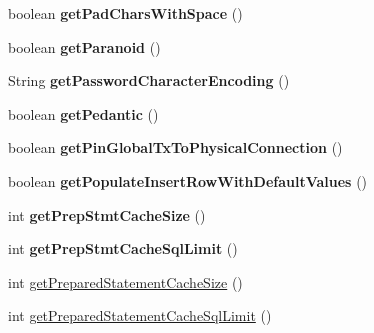 \begin{DoxyCompactItemize}
boolean {\bfseries get\+Pad\+Chars\+With\+Space} ()
\item 
\mbox{\label{classcom_1_1mysql_1_1jdbc_1_1_multi_host_my_s_q_l_connection_aef3281dd78972fb804fabcd9b445b0b8}} 
boolean {\bfseries get\+Paranoid} ()
\item 
\mbox{\label{classcom_1_1mysql_1_1jdbc_1_1_multi_host_my_s_q_l_connection_a4285fc8c28cfef8a1a963eb583625db9}} 
String {\bfseries get\+Password\+Character\+Encoding} ()
\item 
\mbox{\label{classcom_1_1mysql_1_1jdbc_1_1_multi_host_my_s_q_l_connection_a784448d55787eb5936aa78ae6fc3907e}} 
boolean {\bfseries get\+Pedantic} ()
\item 
\mbox{\label{classcom_1_1mysql_1_1jdbc_1_1_multi_host_my_s_q_l_connection_a90759bd97891acb552b5386220049e08}} 
boolean {\bfseries get\+Pin\+Global\+Tx\+To\+Physical\+Connection} ()
\item 
\mbox{\label{classcom_1_1mysql_1_1jdbc_1_1_multi_host_my_s_q_l_connection_ac2002381caf2e79b0a81c02d7b4b04c3}} 
boolean {\bfseries get\+Populate\+Insert\+Row\+With\+Default\+Values} ()
\item 
\mbox{\label{classcom_1_1mysql_1_1jdbc_1_1_multi_host_my_s_q_l_connection_a14716683053715063033c2d81e833cbf}} 
int {\bfseries get\+Prep\+Stmt\+Cache\+Size} ()
\item 
\mbox{\label{classcom_1_1mysql_1_1jdbc_1_1_multi_host_my_s_q_l_connection_ada21d005d5c435a1746c3d6c4bc10eca}} 
int {\bfseries get\+Prep\+Stmt\+Cache\+Sql\+Limit} ()
\item 
int \mbox{\hyperlink{classcom_1_1mysql_1_1jdbc_1_1_multi_host_my_s_q_l_connection_a6308b3767baa0f4cbf8eecdd7991533d}{get\+Prepared\+Statement\+Cache\+Size}} ()
\item 
int \mbox{\hyperlink{classcom_1_1mysql_1_1jdbc_1_1_multi_host_my_s_q_l_connection_a183bd1cac2423d1b6c228c310cb6d43b}{get\+Prepared\+Statement\+Cache\+Sql\+Limit}} ()

\end{DoxyCompactItemize}
